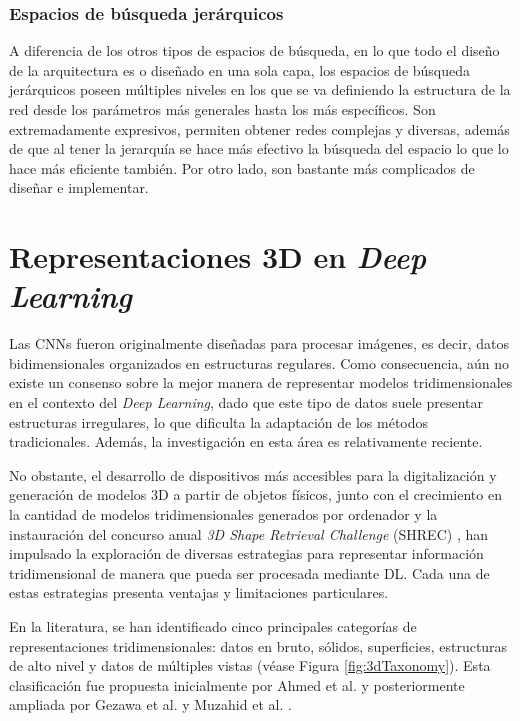 \subsubsection{Espacios de búsqueda jerárquicos}
A diferencia de los otros tipos de espacios de búsqueda, en lo que todo el diseño de la arquitectura es  o diseñado en una sola capa, los espacios de búsqueda jerárquicos poseen múltiples niveles en los que se va definiendo la estructura de la red desde los parámetros más generales hasta los más específicos. Son extremadamente expresivos, permiten obtener redes complejas y diversas, además de que al tener la jerarquía se hace más efectivo la búsqueda del espacio lo que lo hace más eficiente también. Por otro lado, son bastante más complicados de diseñar e implementar.

\section{Representaciones 3D en \textit{Deep Learning}}
\label{3d_reps}
Las CNNs fueron originalmente diseñadas para procesar imágenes, es decir, datos bidimensionales organizados en estructuras regulares. Como consecuencia, aún no existe un consenso sobre la mejor manera de representar modelos tridimensionales en el contexto del \textit{Deep Learning}, dado que este tipo de datos suele presentar estructuras irregulares, lo que dificulta la adaptación de los métodos tradicionales. Además, la investigación en esta área es relativamente reciente.

No obstante, el desarrollo de dispositivos más accesibles para la digitalización y generación de modelos 3D a partir de objetos físicos, junto con el crecimiento en la cantidad de modelos tridimensionales generados por ordenador y la instauración del concurso anual \textit{3D Shape Retrieval Challenge} (SHREC) \cite{noauthor_shrec_nodate, noauthor_3dor2024_nodate}, han impulsado la exploración de diversas estrategias para representar información tridimensional de manera que pueda ser procesada mediante DL. Cada una de estas estrategias presenta ventajas y limitaciones particulares.

En la literatura, se han identificado cinco principales categorías de representaciones tridimensionales: datos en bruto, sólidos, superficies, estructuras de alto nivel y datos de múltiples vistas (véase Figura \ref{fig:3dTaxonomy}). Esta clasificación fue propuesta inicialmente por Ahmed et al. \cite{ahmed_survey_2019} y posteriormente ampliada por Gezawa et al. \cite{gezawa_review_2020} y Muzahid et al. \cite{muzahid_deep_2024}.

